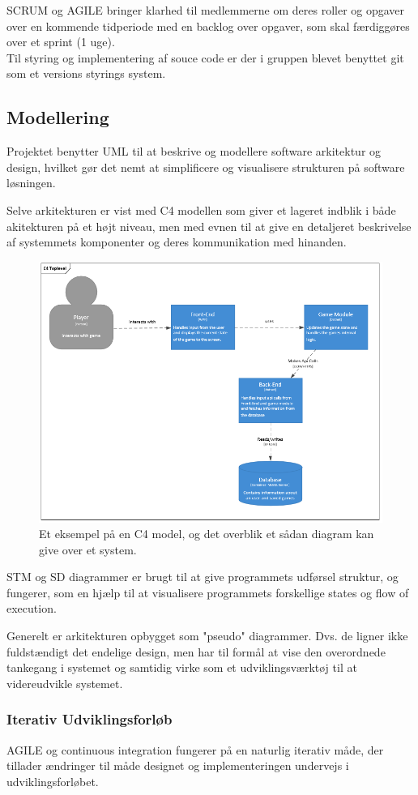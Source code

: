 SCRUM og AGILE bringer klarhed til medlemmerne om deres roller og opgaver over en 
kommende tidperiode med en backlog over opgaver, som skal færdiggøres over et sprint (1 uge).\\
Til styring og implementering af souce code er der i gruppen blevet benyttet git som et versions styrings system.

\subsection{Modellering}
Projektet benytter UML til at beskrive og modellere software arkitektur
og design, hvilket gør det nemt at simplificere og visualisere strukturen på software
løsningen. 

Selve arkitekturen er vist med C4 modellen som giver et lageret indblik i både
akitekturen på et højt niveau, men med evnen til at give en detaljeret beskrivelse
af systemmets komponenter og deres kommunikation med hinanden.

\begin{figure}[H]
  \centering
  \includegraphics[scale=0.8]{02-Body/Images/C4TopLvlDB.PNG}
  \caption{Et eksempel på en C4 model, og det overblik et sådan diagram kan give over et system.}
  \label{fig:c4}
\end{figure}

STM og SD diagrammer er brugt til at give programmets udførsel struktur, og fungerer,
som en hjælp til at visualisere programmets forskellige states og flow of execution.

Generelt er arkitekturen opbygget som "pseudo" diagrammer. Dvs. de ligner ikke fuldstændigt det endelige design, men har til formål at vise den overordnede tankegang i systemet og samtidig virke som et udviklingsværktøj til at videreudvikle systemet.

\subsubsection{Iterativ Udviklingsforløb}

AGILE og continuous integration fungerer på en naturlig iterativ måde, der tillader 
ændringer til måde designet og implementeringen undervejs i udviklingsforløbet.\\



